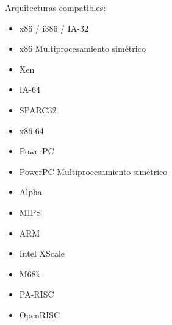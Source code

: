 Arquitecturas compatibles:

				\begin{itemize}
				\item x86 / i386 / IA-32
				\item x86 Multiprocesamiento simétrico
				\item Xen
				\item IA-64 	
				\item SPARC32
				\item x86-64
				\item PowerPC
				\item PowerPC Multiprocesamiento simétrico
				\item Alpha
				\item MIPS
				\item ARM
				\item Intel XScale
				\item M68k
				\item PA-RISC
				\item OpenRISC
			\end{itemize}			




